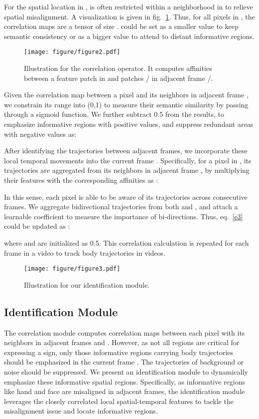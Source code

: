 \documentclass[10pt,twocolumn,letterpaper]{article}
\begin{document}
For the spatial location  in ,  is often restricted within a  neighborhood in  to relieve spatial misalignment. A visualization is given in fig.~\ref{fig2}. Thus, for all pixels in , the correlation maps are a tensor of size .  could be set as a smaller value to keep semantic consistency or as a bigger value to attend to distant informative regions. 

\begin{figure}[t]
  \centering
  \texttt{[image: figure/figure2.pdf]}
  \caption{ Illustration for the correlation operator. It computes affinities between a feature patch  in  and patches / in adjacent frame /.}
  \label{fig2}
  \vspace{-5px}
  \end{figure}

Given the correlation map between a pixel and its neighbors in adjacent frame , we constrain its range into (0,1) to measure their semantic similarity by passing  through a sigmoid function. We further subtract 0.5 from the results, to emphasize informative regions with positive values, and suppress redundant areas with negative values as:


After identifying the trajectories between adjacent frames, we incorporate these local temporal movements into the current frame . Specifically, for a pixel in , its trajectories are aggregated from its  neighbors in adjacent frame , by multiplying their features with the corresponding affinities as :


In this sense, each pixel is able to be aware of its trajectories across consecutive frames. We aggregate bidirectional trajectories from both  and , and attach a learnable coefficient  to measure the importance of bi-directions. Thus, eq.~\ref{e3} could be updated as :

where  and  are initialized as 0.5.  This correlation calculation is repeated for each frame in a video to track body trajectories in videos.

\begin{figure}[t]
  \centering
  \texttt{[image: figure/figure3.pdf]}
  \caption{Illustration for our identification module.}
  \label{fig3}
  \end{figure}

\subsection{Identification Module}
The correlation module computes correlation maps between each pixel with its  neighbors in adjacent frames  and . However, as not all regions are critical for expressing a sign, only those informative regions carrying body trajectories should be emphasized in the current frame . The trajectories of background or noise should be suppressed. We present an identification module to dynamically emphasize these informative spatial regions. Specifically, as informative regions like hand and face are misaligned in adjacent frames, the identification module leverages the closely correlated local spatial-temporal features to tackle the misalignment issue and locate informative regions. 
\end{document}
